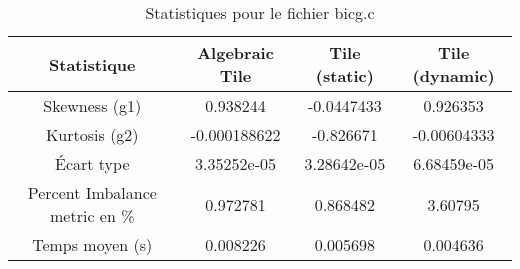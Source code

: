 \documentclass{article}
\begin{document}
\begin{table}[htbp]
  \centering
  \caption{Statistiques pour le fichier bicg.c}
  \begin{tabular}{|c|c|c|c|}
    \hline
    Statistique & Algebraic Tile & Tile (static) & Tile (dynamic) \\ 
    \hline
    Skewness (g1) & 0.938244 & -0.0447433 & 0.926353 \\ 
    Kurtosis (g2) & -0.000188622 & -0.826671 & -0.00604333 \\ 
    Écart type & 3.35252e-05 & 3.28642e-05 & 6.68459e-05\\ 
    Percent Imbalance metric en \% & 0.972781 & 0.868482 & 3.60795\\ 
    Temps moyen (s) & 0.008226 & 0.005698 & 0.004636 \\ 
    \hline
  \end{tabular}
\end{table}
\newpage
\end{document}
